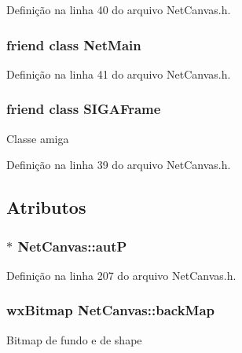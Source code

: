 Definição na linha 40 do arquivo Net\+Canvas.\+h.

\subsubsection[{Net\+Main}]{\setlength{\rightskip}{0pt plus 5cm}friend class {\bf Net\+Main}\hspace{0.3cm}{\ttfamily [friend]}}\label{class_net_canvas_a3369da6ff2a507b113cce97adec8bc0f}


Definição na linha 41 do arquivo Net\+Canvas.\+h.

\subsubsection[{S\+I\+G\+A\+Frame}]{\setlength{\rightskip}{0pt plus 5cm}friend class {\bf S\+I\+G\+A\+Frame}\hspace{0.3cm}{\ttfamily [friend]}}\label{class_net_canvas_a9d47c290d5cd19d44bd1f4e8a4817caa}
Classe amiga 

Definição na linha 39 do arquivo Net\+Canvas.\+h.



\subsection{Atributos}
\subsubsection[{autP}]{$\ast$ Net\+Canvas\+::autP}\label{class_net_canvas_ac634cf3a29edad7b3f0d8b606032967a}


Definição na linha 207 do arquivo Net\+Canvas.\+h.

\subsubsection[{back\+Map}]{\setlength{\rightskip}{0pt plus 5cm}wx\+Bitmap Net\+Canvas\+::back\+Map}\label{class_net_canvas_ac15d79f7c8415abad262375501c6dc8b}
Bitmap de fundo e de shape 


